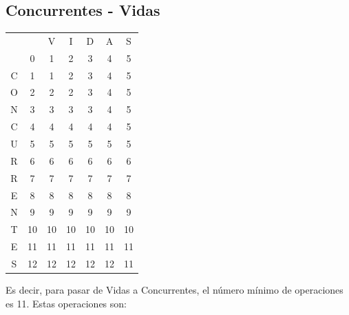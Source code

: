 \documentclass[10pt,a4paper,spanish]{report}
\theoremstyle{definition}
\theoremstyle{remark}
\begin{document}
\subsection{\textcolor{amethyst}Concurrentes - \textcolor{amethyst}Vidas}
\begin{center}
\begin{tabular}{c|c|c|c|c|c|c|}
\multicolumn{2}{r}{} & \multicolumn{1}{c}{V} & \multicolumn{1}{c}{I} & \multicolumn{1}{c}{D} & \multicolumn{1}{c}{A} & \multicolumn{1}{c}{S} \\ 
\cline{2-7} 
& $0$ & 1 & 2 & 3 & 4 & 5 \\
\cline{2-7} 
C & 1 & 1 & 2 & 3 & 4 & 5 \\
\cline{2-7}
O & 2 & 2 & 2 & 3 & 4 & 5 \\
\cline{2-7} 
N & 3 & 3 & 3 & 3 & 4 & 5 \\
\cline{2-7} 
C & 4 & 4 & 4 & 4 & 4 & 5 \\
\cline{2-7} 
U & 5 & 5 & 5 & 5 & 5 & 5 \\
\cline{2-7} 
R & 6 & 6 & 6 & 6 & 6 & 6 \\
\cline{2-7} 
R & 7 & 7 & 7 & 7 & 7 & 7 \\
\cline{2-7} 
E & 8 & 8 & 8 & 8 & 8 & 8 \\
\cline{2-7} 
N & 9 & 9 & 9 & 9 & 9 & 9 \\
\cline{2-7} 
T & 10 & 10 & 10 & 10 & 10 & 10 \\
\cline{2-7} 
E & 11 & 11 & 11 & 11 & 11 & 11 \\
\cline{2-7} 
S & 12 & 12 & 12 & 12 & 12 & \cellcolor{Green}11 \\
\cline{2-7}
\end{tabular}
\end{center}

Es decir, para pasar de Vidas a Concurrentes, el número mínimo de operaciones es 11. Estas operaciones son:
\end{document}

